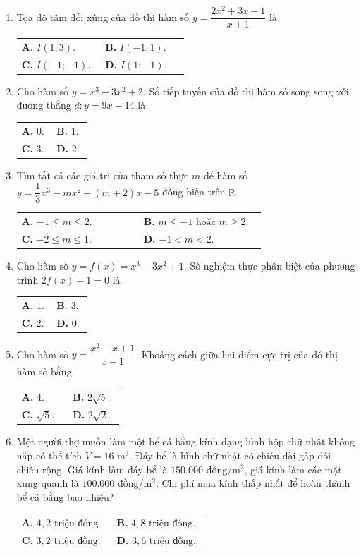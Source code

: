 \documentclass[12pt,a4paper]{article}
\makeatletter
\newcommand{\bonpa}[4]{\par\smallskip\noindent
\begin{tabular}{@{}p{0.47\linewidth}p{0.47\linewidth}@{}}
\textbf{A.} #1 & \textbf{B.} #2\\[3pt]
\textbf{C.} #3 & \textbf{D.} #4\end{tabular}}
\makeatother
\begin{document}
\begin{enumerate}
\item Tọa độ tâm đối xứng của đồ thị hàm số $y = \dfrac{2x^2 + 3x - 1}{x + 1}$ là
\bonpa{$I(1; 3)$.}{$I(-1; 1)$.}{$I(-1; -1)$.}{$I(1; -1)$.}

\item Cho hàm số $y = x^3 - 3x^2 + 2$. Số tiếp tuyến của đồ thị hàm số song song với đường thẳng $d: y = 9x - 14$ là
\bonpa{$0$.}{$1$.}{$3$.}{$2$.}

\item Tìm tất cả các giá trị của tham số thực $m$ để hàm số $y = \dfrac{1}{3}x^3 - mx^2 + (m+2)x - 5$ đồng biến trên $\mathbb{R}$.
\bonpa{$-1 \le m \le 2$.}{$m \le -1\text{ hoặc }m \ge 2$.}{$-2 \le m \le 1$.}{$-1 < m < 2$.}

\item Cho hàm số $y = f(x) = x^3 - 3x^2 + 1$. Số nghiệm thực phân biệt của phương trình $2f(x) - 1 = 0$ là
\bonpa{$1$.}{$3$.}{$2$.}{$0$.}

\item Cho hàm số $y = \dfrac{x^2 - x + 1}{x - 1}$. Khoảng cách giữa hai điểm cực trị của đồ thị hàm số bằng
\bonpa{$4$.}{$2\sqrt{5}$.}{$\sqrt{5}$.}{$2\sqrt{2}$.}

\item Một người thợ muốn làm một bể cá bằng kính dạng hình hộp chữ nhật không nắp có thể tích $V = 16\text{ m}^3$. Đáy bể là hình chữ nhật có chiều dài gấp đôi chiều rộng. Giá kính làm đáy bể là $150.000$ đồng/$\text{m}^2$, giá kính làm các mặt xung quanh là $100.000$ đồng/$\text{m}^2$. Chi phí mua kính thấp nhất để hoàn thành bể cá bằng bao nhiêu?
\bonpa{$4{,}2\text{ triệu đồng}$.}{$4{,}8\text{ triệu đồng}$.}{$3{,}2\text{ triệu đồng}$.}{$3{,}6\text{ triệu đồng}$.}
\end{enumerate}

\newpage
\end{document}
